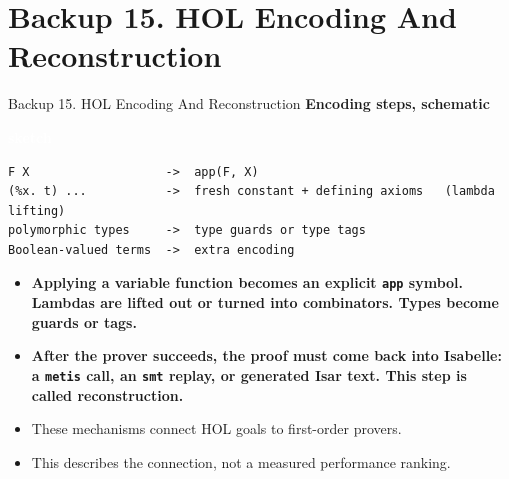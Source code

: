 \documentclass[aspectratio=169,11pt]{beamer}
\newcommand{\statusbadge}[2]{\colorbox{#1}{\textcolor{white}{\strut\scriptsize\sffamily\bfseries #2}}}
\newcommand{\badgeSketch}{\statusbadge{orange!75!black}{sketch}}
\begin{document}
\section{Backup 15. HOL Encoding And Reconstruction}
\begin{frame}[fragile,t]{Backup 15. HOL Encoding And Reconstruction}
\smallskip
\textbf{Encoding steps, schematic}~\badgeSketch
\begin{lstlisting}[language={},basicstyle=\ttfamily\footnotesize]
F X                   ->  app(F, X)
(%x. t) ...           ->  fresh constant + defining axioms   (lambda lifting)
polymorphic types     ->  type guards or type tags
Boolean-valued terms  ->  extra encoding
\end{lstlisting}
\begin{itemize}
\setlength{\itemsep}{1pt}
\setlength{\parsep}{0pt}
\setlength{\parskip}{0pt}
\item \textcolor{blue!55!black}{\textbf{Applying a variable function becomes an explicit \texttt{app} symbol. Lambdas are lifted out or turned into combinators. Types become guards or tags.}}
\item \textcolor{blue!55!black}{\textbf{After the prover succeeds, the proof must come back into Isabelle: a \texttt{metis} call, an \texttt{smt} replay, or generated Isar text. This step is called reconstruction.}}
\item These mechanisms connect HOL goals to first-order provers.
\item This describes the connection, not a measured performance ranking.
\end{itemize}
\end{frame}
\end{document}

